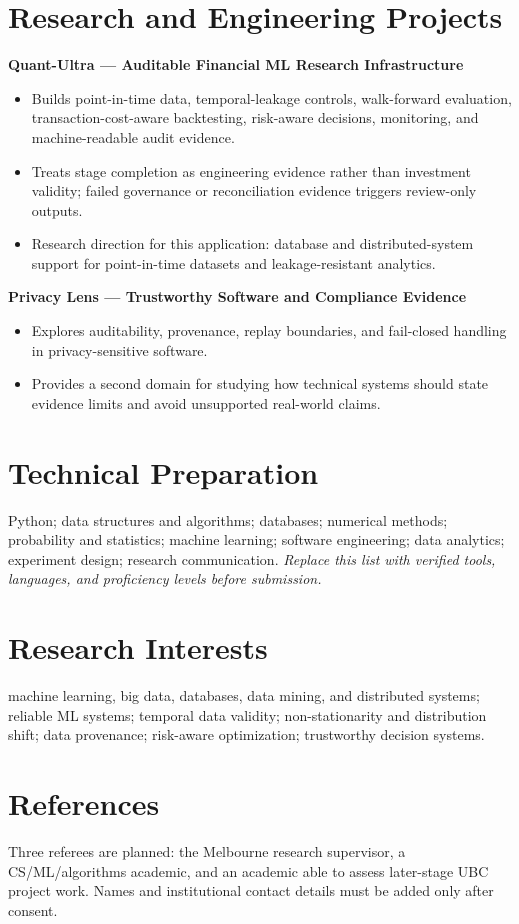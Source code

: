 \documentclass[11pt]{article}
\begin{document}
\section*{Research and Engineering Projects}
\textbf{Quant-Ultra --- Auditable Financial ML Research Infrastructure}
\begin{itemize}
\item Builds point-in-time data, temporal-leakage controls, walk-forward evaluation, transaction-cost-aware backtesting, risk-aware decisions, monitoring, and machine-readable audit evidence.
\item Treats stage completion as engineering evidence rather than investment validity; failed governance or reconciliation evidence triggers review-only outputs.
\item Research direction for this application: database and distributed-system support for point-in-time datasets and leakage-resistant analytics.
\end{itemize}

\begin{samepage}
\textbf{Privacy Lens --- Trustworthy Software and Compliance Evidence}
\begin{itemize}
\item Explores auditability, provenance, replay boundaries, and fail-closed handling in privacy-sensitive software.
\item Provides a second domain for studying how technical systems should state evidence limits and avoid unsupported real-world claims.
\end{itemize}
\end{samepage}

\section*{Technical Preparation}
Python; data structures and algorithms; databases; numerical methods; probability and statistics; machine learning; software engineering; data analytics; experiment design; research communication. \textit{Replace this list with verified tools, languages, and proficiency levels before submission.}

\section*{Research Interests}
machine learning, big data, databases, data mining, and distributed systems; reliable ML systems; temporal data validity; non-stationarity and distribution shift; data provenance; risk-aware optimization; trustworthy decision systems.

\section*{References}
Three referees are planned: the Melbourne research supervisor, a CS/ML/algorithms academic, and an academic able to assess later-stage UBC project work. Names and institutional contact details must be added only after consent.
\end{document}
